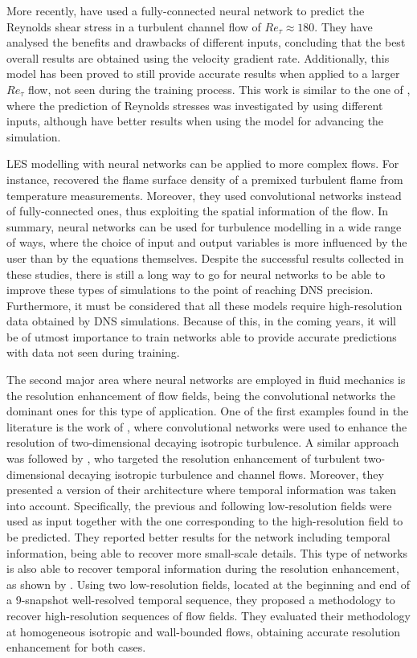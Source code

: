 More recently, \citet{park2021toward} have used a fully-connected neural network to predict the Reynolds shear stress in a turbulent channel flow of $Re_{\tau}\approx180$.
They have analysed the benefits and drawbacks of different inputs, concluding that the best overall results are obtained using the velocity gradient rate.
Additionally, this model has been proved to still provide accurate results when applied to a larger $Re_{\tau}$ flow, not seen during the training process.
This work is similar to the one of \citet{gamahara2017searching}, where the prediction of Reynolds stresses was investigated by using different inputs, although \citet{park2021toward} have better results when using the model for advancing the simulation.

LES modelling with neural networks can be applied to more complex flows.
For instance, \citet{lapeyre2019training} recovered the flame surface density of a premixed turbulent flame from temperature measurements.
Moreover, they used convolutional networks instead of fully-connected ones, thus exploiting the spatial information of the flow.
In summary, neural networks can be used for turbulence modelling in a wide range of ways, where the choice of input and output variables is more influenced by the user than by the equations themselves.
Despite the successful results collected in these studies, there is still a long way to go for neural networks to be able to improve these types of simulations to the point of reaching DNS precision.
Furthermore, it must be considered that all these models require high-resolution data obtained by DNS simulations.
Because of this, in the coming years, it will be of utmost importance to train networks able to provide accurate predictions with data not seen during training.

The second major area where neural networks are employed in fluid mechanics is the resolution enhancement of flow fields, being the convolutional networks the dominant ones for this type of application.
One of the first examples found in the literature is the work of \citet{fukami2019super}, where convolutional networks were used to enhance the resolution of two-dimensional decaying isotropic turbulence.
A similar approach was followed by \cite{liu2020deep}, who targeted the resolution enhancement of turbulent two-dimensional decaying isotropic turbulence and channel flows.
Moreover, they presented a version of their architecture where temporal information was taken into account.
Specifically, the previous and following low-resolution fields were used as input together with the one corresponding to the high-resolution field to be predicted.
They reported better results for the network including temporal information, being able to recover more small-scale details.
This type of networks is also able to recover temporal information during the resolution enhancement, as shown by \citet{fukami2021machine}.
Using two low-resolution fields, located at the beginning and end of a 9-snapshot well-resolved temporal sequence, they proposed a methodology to recover high-resolution sequences of flow fields.
They evaluated their methodology at homogeneous isotropic and wall-bounded flows, obtaining accurate resolution enhancement for both cases.

